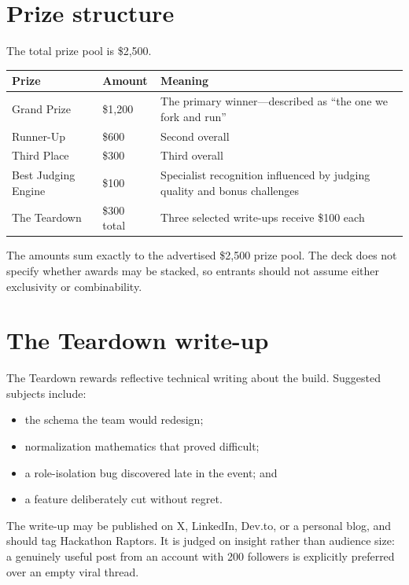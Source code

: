 \documentclass[11pt]{article}
\begin{document}
\section{Prize structure}

The total prize pool is \$2,500.

\begin{tabularx}{\linewidth}{@{}Y L{30mm}Y@{}}
\toprule
\textbf{Prize} & \textbf{Amount} & \textbf{Meaning}\\
\midrule
Grand Prize & \$1,200 & The primary winner---described as ``the one we fork and run''\\
Runner-Up & \$600 & Second overall\\
Third Place & \$300 & Third overall\\
Best Judging Engine & \$100 & Specialist recognition influenced by judging quality and bonus challenges\\
The Teardown & \$300 total & Three selected write-ups receive \$100 each\\
\bottomrule
\end{tabularx}

The amounts sum exactly to the advertised \$2,500 prize pool. The deck does not specify whether awards may be stacked, so entrants should not assume either exclusivity or combinability.

\section{The Teardown write-up}

The Teardown rewards reflective technical writing about the build. Suggested subjects include:

\begin{itemize}
  \item the schema the team would redesign;
  \item normalization mathematics that proved difficult;
  \item a role-isolation bug discovered late in the event; and
  \item a feature deliberately cut without regret.
\end{itemize}

The write-up may be published on X, LinkedIn, Dev.to, or a personal blog, and should tag Hackathon Raptors. It is judged on insight rather than audience size: a genuinely useful post from an account with 200 followers is explicitly preferred over an empty viral thread.
\end{document}
